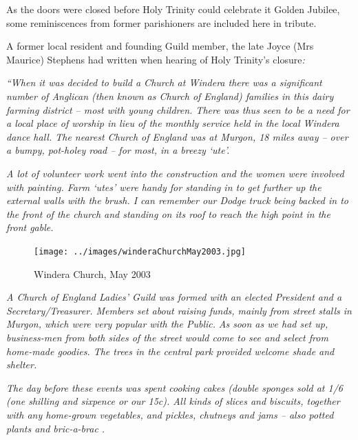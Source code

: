 As the doors were closed before Holy Trinity could celebrate it Golden Jubilee, some reminiscences from former parishioners are included here in tribute.



A former local resident and founding Guild member, the late Joyce (Mrs Maurice) Stephens had written when hearing of Holy Trinity's closure\emph{:}



\emph{``When it was decided to build a Church at Windera there was a significant number of Anglican (then known as Church of England) families in this dairy farming district -- most with young children. There was thus seen to be a need for a local place of worship in lieu of the monthly service held in the local Windera dance hall. The nearest Church of England was at Murgon, 18 miles away -- over a bumpy, pot-holey road -- for most, in a breezy `ute'.}



\emph{A lot of volunteer work went into the construction and the women were involved with painting. Farm `utes' were handy for standing in to get further up the external walls with the brush. I can remember our Dodge truck being backed in to the front of the church and standing on its roof to reach the high point in the front gable.}









\begin{figure}[!htb]
\begin{center}
\texttt{[image: ../images/winderaChurchMay2003.jpg]}
\caption{Windera Church, May 2003}
\end{center}
\end{figure}




\emph{A Church of England Ladies' Guild was formed with an elected President and a Secretary/Treasurer. Members set about raising funds, mainly from street stalls in Murgon, which were very popular with the Public.} \emph{As soon as we had set up, business-men from both sides of the street would come to see and select from home-made goodies. The trees in the central park provided welcome shade and shelter.}



\emph{The day before these events was spent cooking cakes (double sponges sold at 1/6 (one shilling and sixpence or our 15c). All kinds of slices and biscuits, together with any home-grown vegetables, and pickles, chutneys and jams -- also potted plants and bric-a-brac .}



